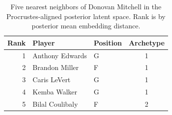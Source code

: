 \begin{table}[htbp]
  \centering\small
  \begin{tabular}{rllc}
    \toprule
    Rank & Player & Position & Archetype \\
    \midrule
    1 & Anthony Edwards & G & 1 \\
    2 & Brandon Miller & F & 1 \\
    3 & Caris LeVert & G & 1 \\
    4 & Kemba Walker & G & 1 \\
    5 & Bilal Coulibaly & F & 2 \\
    \bottomrule
  \end{tabular}
  \caption{Five nearest neighbors of Donovan Mitchell in the Procrustes-aligned posterior latent space. Rank is by posterior mean embedding distance.}
  \label{tab:Donovan_Mitchell_neighbors}
\end{table}

